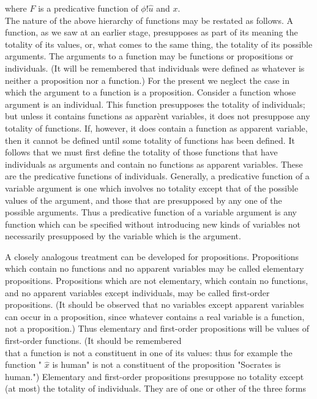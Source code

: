 \documentclass[10pt]{article}
\begin{document}
where $F$ is a predicative function of $\phi!\hat{u}$ and $x$.\\
The nature of the above hierarchy of functions may be restated as follows. A function, as we saw at an earlier stage, presupposes as part of its meaning the totality of its values, or, what comes to the same thing, the totality of its possible arguments. The arguments to a function may be functions or propositions or individuals. (It will be remembered that individuals were defined as whatever is neither a proposition nor a function.) For the present we neglect the case in which the argument to a function is a proposition. Consider a function whose argument is an individual. This function presupposes the totality of individuals; but unless it contains functions as apparènt variables, it does not presuppose any totality of functions. If, however, it does contain a function as apparent variable, then it cannot be defined until some totality of functions has been defined. It follows that we must first define the totality of those functions that have individuals as arguments and contain no functions as apparent variables. These are the predicative functions of individuals. Generally, a predicative function of a variable argument is one which involves no totality except that of the possible values of the argument, and those that are presupposed by any one of the possible arguments. Thus a predicative function of a variable argument is any function which can be specified without introducing new kinds of variables not necessarily presupposed by the variable which is the argument.

A closely analogous treatment can be developed for propositions. Propositions which contain no functions and no apparent variables may be called elementary propositions. Propositions which are not elementary, which contain no functions, and no apparent variables except individuals, may be called first-order propositions. (It should be observed that no variables except apparent variables can occur in a proposition, since whatever contains a real variable is a function, not a proposition.) Thus elementary and first-order propositions will be values of first-order functions. (It should be remembered\\
that a function is not a constituent in one of its values: thus for example the function " $\hat{x}$ is human" is not a constituent of the proposition "Socrates is human.") Elementary and first-order propositions presuppose no totality except (at most) the totality of individuals. They are of one or other of the three forms
\end{document}
